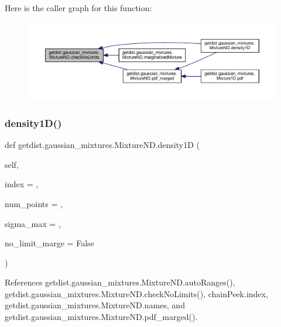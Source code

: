 Here is the caller graph for this function\+:
\nopagebreak
\begin{figure}[H]
\begin{center}
\leavevmode
\includegraphics[width=350pt]{classgetdist_1_1gaussian__mixtures_1_1MixtureND_a3878c180b2a99c4a7f257fea5a7a7d0f_icgraph}
\end{center}
\end{figure}
\mbox{\label{classgetdist_1_1gaussian__mixtures_1_1MixtureND_a19dac60689b4c4e7772ffa807aad2dc0}} 
\subsubsection{\texorpdfstring{density1\+D()}{density1D()}}
{\footnotesize\ttfamily def getdist.\+gaussian\+\_\+mixtures.\+Mixture\+N\+D.\+density1D (\begin{DoxyParamCaption}\item[{}]{self,  }\item[{}]{index = {},  }\item[{}]{num\+\_\+points = {},  }\item[{}]{sigma\+\_\+max = {},  }\item[{}]{no\+\_\+limit\+\_\+marge = {\ttfamily False} }\end{DoxyParamCaption})}



References getdist.\+gaussian\+\_\+mixtures.\+Mixture\+N\+D.\+auto\+Ranges(), getdist.\+gaussian\+\_\+mixtures.\+Mixture\+N\+D.\+check\+No\+Limits(), chain\+Peek.\+index, getdist.\+gaussian\+\_\+mixtures.\+Mixture\+N\+D.\+names, and getdist.\+gaussian\+\_\+mixtures.\+Mixture\+N\+D.\+pdf\+\_\+marged().

